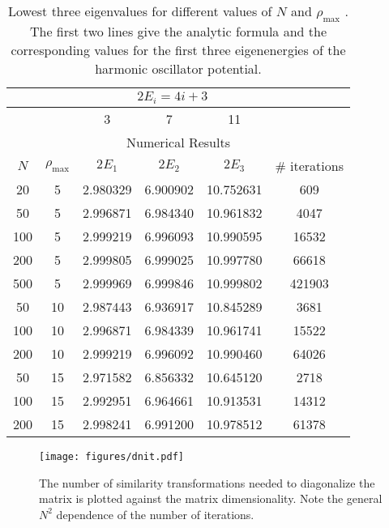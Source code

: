 \documentclass[10pt,showpacs,preprintnumbers,footinbib,amsmath,amssymb,aps,prl,twocolumn,groupedaddress,superscriptaddress,showkeys]{revtex4-1}
\newcommand{\rhomax}{
	\ensuremath{ \rho _{\mathrm{max}}} }
\begin{document}
{%

\begin{table}[h]
\centering
	\begin{tabular}{ c c | c c c | c }
	 & & \multicolumn{3}{c}{$2 E_i = 4i + 3$} &\\
\hline
	 & & 3 & 7 & 11 & \\
\hline
	\multicolumn{6}{c}{Numerical Results}\\
\hline
	$N$ & \rhomax & $2E_1$ & $2E_2$ & $2E_3$ & \# iterations\\
\hline
	20  & 5  & 2.980329 & 6.900902 & 10.752631 & 609\\
	50  & 5  & 2.996871 & 6.984340 & 10.961832 & 4047\\
	100 & 5 & 2.999219 & 6.996093 & 10.990595 & 16532\\
	200 & 5 & 2.999805 & 6.999025 & 10.997780 & 66618\\
	500 & 5 & 2.999969 & 6.999846 & 10.999802 & 421903\\
\hline
	50   & 10 & 2.987443 & 6.936917 & 10.845289 & 3681\\
	100 & 10 & 2.996871 & 6.984339 & 10.961741 & 15522\\
	200 & 10 & 2.999219 & 6.996092 & 10.990460 & 64026\\
\hline
	50   & 15 & 2.971582 & 6.856332 & 10.645120 & 2718\\
	100 & 15 & 2.992951 & 6.964661 & 10.913531 & 14312\\
	200 & 15 & 2.998241 & 6.991200 & 10.978512 & 61378\\
	\end{tabular}
	\caption{Lowest three eigenvalues for different values of
	$N$ and \rhomax. The first two lines give the analytic
	formula and the corresponding values for the first three
	eigenenergies of the harmonic oscillator potential.}
	\label{tab:NRhoResults}
\end{table}

\begin{figure}
\centering
	\texttt{[image: figures/dnit.pdf]}
	\caption{The number of similarity transformations needed to
	diagonalize the matrix is plotted against the matrix
	dimensionality. Note the general $N^2$ dependence of
	the number of iterations.}
	\label{fig:dnit}
\end{figure}

}
\end{document}
